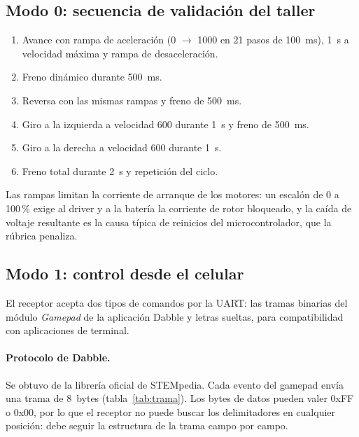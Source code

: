 \subsection{Modo 0: secuencia de validación del taller}

\begin{enumerate}
  \item Avance con rampa de aceleración (0 $\rightarrow$ 1000 en 21 pasos de
        \SI{100}{\milli\second}), \SI{1}{\second} a velocidad máxima y rampa de
        desaceleración.
  \item Freno dinámico durante \SI{500}{\milli\second}.
  \item Reversa con las mismas rampas y freno de \SI{500}{\milli\second}.
  \item Giro a la izquierda a velocidad 600 durante \SI{1}{\second} y freno de
        \SI{500}{\milli\second}.
  \item Giro a la derecha a velocidad 600 durante \SI{1}{\second}.
  \item Freno total durante \SI{2}{\second} y repetición del ciclo.
\end{enumerate}

Las rampas limitan la corriente de arranque de los motores: un escalón de 0 a
100\,\% exige al driver y a la batería la corriente de rotor bloqueado, y la
caída de voltaje resultante es la causa típica de reinicios del
microcontrolador, que la rúbrica penaliza.

\subsection{Modo 1: control desde el celular}

El receptor acepta dos tipos de comandos por la UART: las tramas binarias del
módulo \emph{Gamepad} de la aplicación Dabble y letras sueltas, para
compatibilidad con aplicaciones de terminal.

\paragraph{Protocolo de Dabble.} Se obtuvo de la librería oficial de STEMpedia.
Cada evento del gamepad envía una trama de 8~bytes
(tabla~\ref{tab:trama}). Los bytes de datos pueden valer 0xFF o 0x00, por lo
que el receptor no puede buscar los delimitadores en cualquier posición: debe
seguir la estructura de la trama campo por campo.

